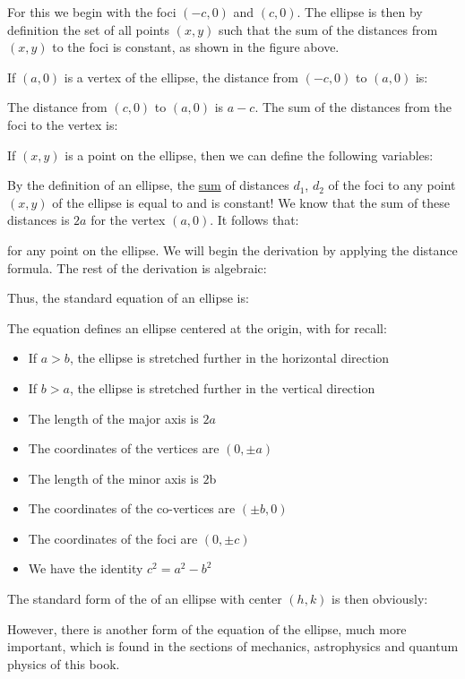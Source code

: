 \begin{enumerate}
		For this we begin with the foci $\left(-c,0\right)$ and $\left(c,0\right)$. The ellipse is then by definition the set of all points $\left(x,y\right)$ such that the sum of the distances from $\left(x,y\right)$ to the foci is constant, as shown in the figure above.
		
		If $\left(a,0\right)$ is a vertex of the ellipse, the distance from $\left(-c,0\right)$ to $\left(a,0\right)$ is:
		
		The distance from $\left(c,0\right)$ to $\left(a,0\right)$ is $a-c$. The sum of the distances from the foci to the vertex is:
		
		If $\left(x,y\right)$ is a point on the ellipse, then we can define the following variables:
		
		By the definition of an ellipse, the \underline{sum} of  distances ${d}_{1}$, ${d}_{2}$ of the foci to any point $(x,y)$ of the ellipse is equal to  and is constant! We know that the sum of these distances is $2a$ for the vertex $(a,0)$. It follows that:
		
		for any point on the ellipse. We will begin the derivation by applying the distance formula. The rest of the derivation is algebraic:
		
		Thus, the standard equation of an ellipse is:
		
		The equation defines an ellipse centered at the origin, with for recall:
		\begin{itemize}
			\item If $a>b$, the ellipse is stretched further in the horizontal direction
			\item If $b>a$, the ellipse is stretched further in the vertical direction
			\item The length of the major axis is $2a$
			\item The coordinates of the vertices are $(0,\pm a)$
			\item The length of the minor axis is $2$b
			\item The coordinates of the co-vertices are $(\pm b,0)$
			\item The coordinates of the foci are $(0,\pm c)$
			\item We have the identity $c^2=a^2-b^2$
		\end{itemize}
		\label{centered offset ellipse}The standard form of the of an ellipse with center $(h,k)$ is then obviously:
		
	
		However, there is another form of the equation of the ellipse, much more important, which is found in the sections of mechanics, astrophysics and quantum physics of this book.
		

\end{enumerate}
